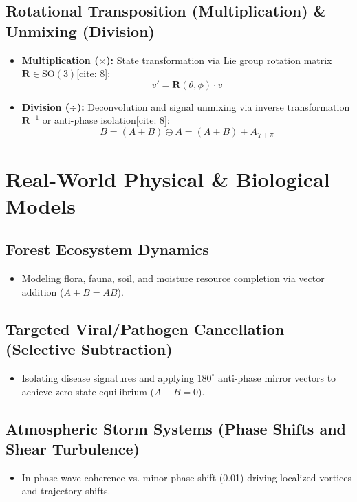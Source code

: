 \documentclass[12pt, a4paper]{article}
\begin{document}
\subsection{Rotational Transposition (Multiplication) \& Unmixing (Division)}
\begin{itemize}
    \item \textbf{Multiplication ($\times$):} State transformation via Lie group rotation matrix $\mathbf{R} \in \mathrm{SO}(3)$[cite: 8]:
    \begin{equation}
        v' = \mathbf{R}(\theta, \phi) \cdot v
    \end{equation}
    \item \textbf{Division ($\div$):} Deconvolution and signal unmixing via inverse transformation $\mathbf{R}^{-1}$ or anti-phase isolation[cite: 8]:
    \begin{equation}
        B = (A + B) \ominus A = (A + B) + A_{\chi+\pi}
    \end{equation}
\end{itemize}

\section{Real-World Physical \& Biological Models}
\subsection{Forest Ecosystem Dynamics}
\begin{itemize}
    \item Modeling flora, fauna, soil, and moisture resource completion via vector addition ($A + B = AB$).
\end{itemize}
\subsection{Targeted Viral/Pathogen Cancellation (Selective Subtraction)}
\begin{itemize}
    \item Isolating disease signatures and applying $180^\circ$ anti-phase mirror
         vectors to achieve zero-state equilibrium ($A - B = 0$).
\end{itemize}
\subsection{Atmospheric Storm Systems (Phase Shifts and Shear Turbulence)}
\begin{itemize}
    \item In-phase wave coherence vs. minor phase shift (0.01) driving localized
         vortices and trajectory shifts.
\end{itemize}
\end{document}
